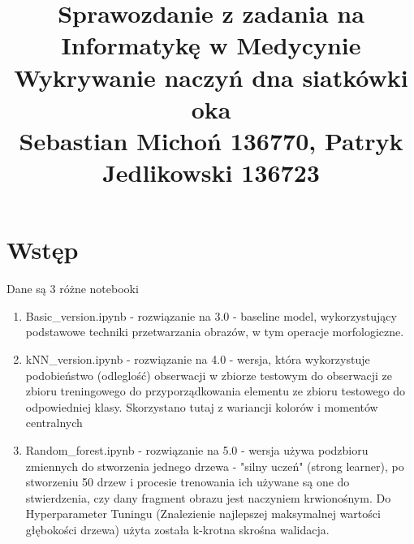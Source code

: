 \documentclass[12pt]{article}
\begin{document}
\title{Sprawozdanie z zadania na Informatykę w Medycynie\\
\large Wykrywanie naczyń dna siatkówki oka\\
\large Sebastian Michoń 136770, Patryk Jedlikowski 136723}
\date{\vspace{-10ex}}
\maketitle

\section{Wstęp}
Dane są 3 różne notebooki
\begin {enumerate}
\item Basic\_version.ipynb - rozwiązanie na 3.0 - baseline model, wykorzystujący podstawowe techniki przetwarzania obrazów, w tym operacje morfologiczne.
\item kNN\_version.ipynb - rozwiązanie na 4.0 - wersja, która wykorzystuje podobieństwo (odleglość) obserwacji w zbiorze testowym do obserwacji ze zbioru treningowego do przyporządkowania elementu ze zbioru testowego do odpowiedniej klasy. Skorzystano tutaj z wariancji kolorów i momentów centralnych
\item Random\_forest.ipynb - rozwiązanie na 5.0 - wersja używa podzbioru zmiennych do stworzenia jednego drzewa - "silny uczeń" (strong learner), po stworzeniu 50 drzew i procesie trenowania ich używane są one do stwierdzenia, czy dany fragment obrazu jest naczyniem krwionośnym. Do Hyperparameter Tuningu (Znalezienie najlepszej maksymalnej wartości głębokości drzewa) użyta została k-krotna skrośna walidacja.
\end {enumerate}
\end{document}
